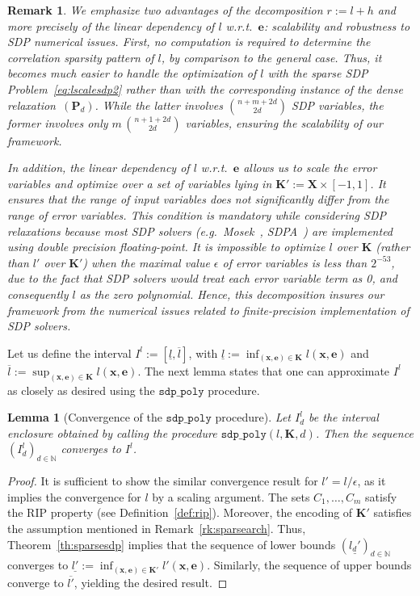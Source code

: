 \documentclass[preprint]{sigplanconf}
\newcommand{\N}{\mathbb{N}}
\newcommand{\x}{\mathbf{x}}
\newcommand{\e}{\mathbf{e}}
\def\P{\mathbf{P}}
\def\K{\mathbf{K}}
\def\X{\mathbf{X}}
\newcommand{\sdppolyfun}[3]{\mathtt{sdp\_poly}(#1, #2, #3)}
\newcommand{\sdppoly}{\mathtt{sdp\_poly}}
\newtheorem{lemma}[theorem]{Lemma}
\theoremstyle{plain}
\newtheorem{remark}{Remark}
\begin{document}
%
\begin{remark}
We emphasize two advantages of the decomposition $r := l + h$ and more precisely of the linear dependency of $l$ w.r.t.~$\e$: scalability and robustness to SDP numerical issues.
First, no computation is required to determine the correlation sparsity pattern of $l$, by comparison to the general case. Thus, it becomes much easier to handle the optimization of $l$ with the sparse SDP Problem~\eqref{eq:lscalesdp2} rather than with the corresponding instance of the dense relaxation~$(\P_d)$. While the latter involves $\binom{n + m+ 2 d}{2 d}$ SDP variables, the former involves only $m \, \binom{n + 1 + 2 d}{2 d}$ variables, ensuring the scalability of our framework.

In addition, the linear dependency of $l$ w.r.t.~$\e$ allows us to scale the error variables and optimize over a set of variables lying in $\K' := \X \times [-1, 1]$. It ensures that the range of input variables does not significantly differ from the range of error variables. This condition is mandatory while considering SDP relaxations because most SDP solvers (e.g.~{\sc Mosek}~\cite{mosek}, {\sc SDPA}~\cite{sdpa7}) are implemented using double precision floating-point. It is impossible to optimize $l$ over $\K$ (rather than $l'$ over $\K'$) when the maximal value $\epsilon$ of error variables is less than $2^{-53}$, due to the fact that SDP solvers would treat each error variable term as 0, and consequently $l$ as the zero polynomial. Hence, this decomposition insures our framework from the numerical issues related to finite-precision implementation of SDP solvers.
\end{remark}
Let us define the interval $I^l := [\underline{l}, \overline{l}]$, with $\underline{l} := \inf_{(\x,\e) \in \K} l(\x,\e)$ and $\overline{l} := \sup_{(\x,\e) \in \K} l(\x,\e)$.
The next lemma states that one can approximate $I^l$ as closely as desired using the $\sdppoly$ procedure.
\begin{lemma}[Convergence of the $\sdppoly$ procedure]
\label{th:cvg_sdppoly}
Let $I_d^l$ be the interval enclosure obtained by calling the procedure $\sdppolyfun{l}{\K}{d}$. Then the sequence $(I_d^l)_{d \in \N}$ converges to $I^l$.
\end{lemma}
%
\begin{proof}
It is sufficient to show the similar convergence result for $l' = l/\epsilon$, as it implies the convergence for $l$ by a scaling argument.
The sets $C_1,\dots, C_m$ satisfy the RIP property (see Definition~\ref{def:rip}). Moreover, the encoding of $\K'$ satisfies the assumption mentioned in Remark~\ref{rk:sparsearch}. Thus, Theorem~\ref{th:sparsesdp} implies that the sequence of lower bounds $(\underline{l_d'})_{d \in \N}$ converges to $\underline{l'} := \inf_{(\x,\e) \in \K'} l'(\x,\e)$. Similarly, the sequence of upper bounds converge to $\overline{l'}$, yielding the desired result.
\end{proof}
\end{document}
